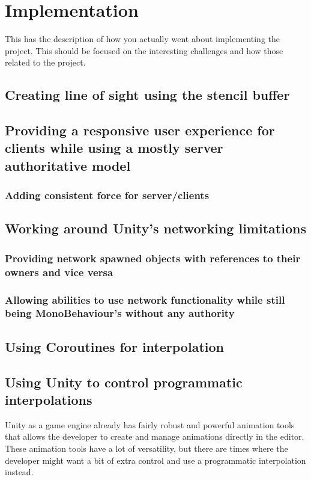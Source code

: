 \chapter{Implementation}
\label{chap:implementation}
This has the description of how you actually went about implementing the project.  This should be focused on the interesting challenges and how those related to the project.

\section{Creating line of sight using the stencil buffer}

\section{Providing a responsive user experience for clients while using a mostly server authoritative model}
\subsection{Adding consistent force for server/clients}

\section{Working around Unity's networking limitations}
\subsection{Providing network spawned objects with references to their owners and vice versa}
\subsection{Allowing abilities to use network functionality while still being MonoBehaviour's without any authority}

\section{Using Coroutines for interpolation}

\section{Using Unity to control programmatic interpolations}
Unity as a game engine already has fairly robust and powerful animation tools that allows the developer to create and manage animations directly in the editor. These animation tools have a lot of versatility, but there are times where the developer might want a bit of extra control and use a programmatic interpolation instead. 

